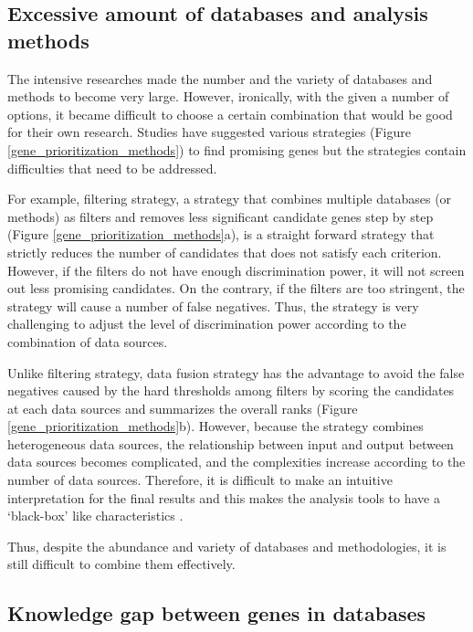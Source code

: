 \documentclass[oneside,phd]{snuthesis}
\begin{document}
\subsection{Excessive amount of databases and analysis methods}

The intensive researches made the number and the variety of databases and methods to become very large. 
However, ironically, with the given a number of options, it became difficult to choose a certain combination that would be good for their own research.
Studies have suggested various strategies \citep{moreau2012computational}(Figure \ref{gene_prioritization_methods}) to find promising genes but the strategies contain difficulties that need to be addressed.

For example, filtering strategy, a strategy that combines multiple databases (or methods) as filters and removes less significant candidate genes step by step (Figure \ref{gene_prioritization_methods}a), is a straight forward strategy that strictly reduces the number of candidates that does not satisfy each criterion. 
However, if the filters do not have enough discrimination power, it will not screen out less promising candidates. 
On the contrary, if the filters are too stringent, the strategy will cause a number of false negatives.
Thus, the strategy is very challenging to adjust the level of discrimination power according to the combination of data sources.

Unlike filtering strategy, data fusion strategy has the advantage to avoid the false negatives caused by the hard thresholds among filters by scoring the candidates at each data sources and summarizes the overall ranks (Figure \ref{gene_prioritization_methods}b).
However, because the strategy combines heterogeneous data sources, the relationship between input and output between data sources becomes complicated, and the complexities increase according to the number of data sources.
Therefore, it is difficult to make an intuitive interpretation for the final results and this makes the analysis tools to have a `black-box' like characteristics \citep{moreau2012computational}.

Thus, despite the abundance and variety of databases and methodologies, it is still difficult to combine them effectively.


\subsection{Knowledge gap between genes in databases}
\end{document}
